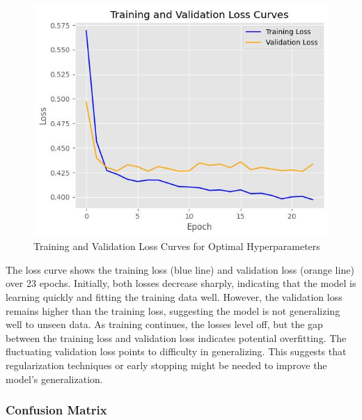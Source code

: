 \begin{figure}[hbt!]
    \centering
    \includegraphics[width=1\linewidth]{Images/5.7.2.a.jpg}
    \caption{Training and Validation Loss Curves for Optimal Hyperparameters}
    \label{fig:enter-label}
\end{figure}

The loss curve shows the training loss (blue line) and validation loss (orange line) over 23 epochs. Initially, both losses decrease sharply, indicating that the model is learning quickly and fitting the training data well. However, the validation loss remains higher than the training loss, suggesting the model is not generalizing well to unseen data. As training continues, the losses level off, but the gap between the training loss and validation loss indicates potential overfitting. The fluctuating validation loss points to difficulty in generalizing. This suggests that regularization techniques or early stopping might be needed to improve the model’s generalization.

\subsubsection{Confusion Matrix}

